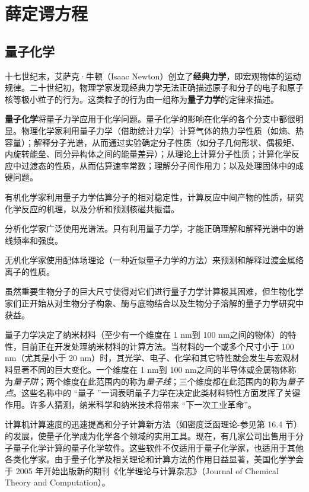 	\chapter{薛定谔方程}
	\label{chap:1}
	\section{量子化学}
	\label{sec:1.1 Quantum Chemistry}
	十七世纪末，艾萨克·牛顿（Isaac Newton）创立了\textbf{经典力学}，即宏观物体的运动规律。二十世纪初，物理学家发现经典力学无法正确描述原子和分子的电子和原子核等极小粒子的行为。这类粒子的行为由一组称为\textbf{量子力学}的定律来描述。

	\textbf{量子化学}将量子力学应用于化学问题。量子化学的影响在化学的各个分支中都很明显。物理化学家利用量子力学（借助统计力学）计算气体的热力学性质（如熵、热容量）；解释分子光谱，从而通过实验确定分子性质（如分子几何形状、偶极矩、内旋转能垒、同分异构体之间的能量差异）；从理论上计算分子性质；计算化学反应中过渡态的性质，从而估算速率常数；理解分子间作用力；以及处理固体中的成键问题。

	有机化学家利用量子力学估算分子的相对稳定性，计算反应中间产物的性质，研究化学反应的机理，以及分析和预测核磁共振谱。
	
	分析化学家广泛使用光谱法。只有利用量子力学，才能正确理解和解释光谱中的谱线频率和强度。

	无机化学家使用配体场理论（一种近似量子力学的方法）来预测和解释过渡金属络离子的性质。

	虽然重要生物分子的巨大尺寸使得对它们进行量子力学计算极其困难，但生物化学家们正开始从对生物分子构象、酶与底物结合以及生物分子溶解的量子力学研究中获益。

	量子力学决定了纳米材料（至少有一个维度在 1 nm到 100 nm之间的物体）的特性，目前正在开发处理纳米材料的计算方法。当材料的一个或多个尺寸小于 100 nm（尤其是小于 20 nm）时，其光学、电子、化学和其它特性就会发生与宏观材料显著不同的巨大变化。一个维度在 1 nm到 100 nm之间的半导体或金属物体称为\textit{量子阱}；两个维度在此范围内的称为\textit{量子线}；三个维度都在此范围内的称为\textit{量子点}。这些名称中的 “量子 ”一词表明量子力学在决定此类材料特性方面发挥了关键作用。许多人猜测，纳米科学和纳米技术将带来 “下一次工业革命”。

	计算机计算速度的迅速提高和分子计算新方法（如密度泛函理论-参见第 16.4 节）的发展，使量子化学成为化学各个领域的实用工具。现在，有几家公司出售用于分子量子化学计算的量子化学软件。这些软件不仅适用于量子化学家，也适用于其他各类化学家。由于量子化学及相关理论和计算方法的作用日益显著，美国化学学会于 2005 年开始出版新的期刊《化学理论与计算杂志》（Journal of Chemical Theory and Computation）。

